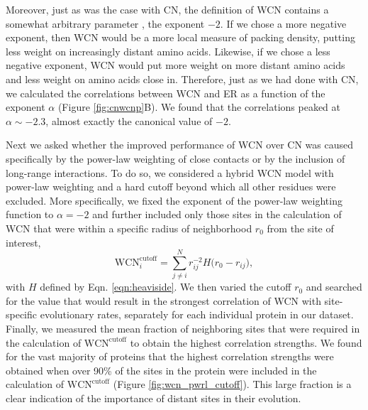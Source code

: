 \documentclass[12pt]{article}
\begin{document}
Moreover, just as was the case with CN, the definition of WCN contains a somewhat arbitrary parameter \cite{yang_protein_2009}, the exponent $-2$. If we chose a more negative exponent, then WCN would be a more local measure of packing density, putting less weight on increasingly distant amino acids. Likewise, if we chose a less negative exponent, WCN would put more weight on more distant amino acids and less weight on amino acids close in. Therefore, just as we had done with CN, we  calculated the correlations between WCN and ER as a function of the exponent $\alpha$ (Figure \ref{fig:cnwcnp}B). We found that the correlations peaked at $\alpha\sim -2.3$, almost exactly the canonical value of $-2$.

Next we asked whether the improved performance of WCN over CN was caused specifically by the power-law weighting of close contacts or by the inclusion of long-range interactions. To do so, we considered a hybrid WCN model with power-law weighting and a hard cutoff beyond which all other residues were excluded. More specifically, we fixed the exponent of the power-law weighting function to $\alpha=-2$ and further included only those sites in the calculation of WCN that were within a specific radius of neighborhood $r_0$ from the site of interest,
    \begin{equation}
        \label{eqn:wcn_pwrl_cutoff}
        \text{WCN}_{i}^\text{cutoff} = \sum^N_{j\neq i} r_{ij}^{-2} H\big(r_0-r_{ij}\big),
    \end{equation}
\noindent with $H$ defined by Eqn. \ref{eqn:heaviside}.
We then varied the cutoff $r_0$ and searched for the value that would result in the strongest correlation of WCN with site-specific evolutionary rates, separately for each individual protein in our dataset. Finally, we measured the mean fraction of neighboring sites that were required in the calculation of $\text{WCN}^\text{cutoff}$  to obtain the highest correlation strengths. We found for the vast majority of proteins that the highest correlation strengths were obtained when over 90\% of the sites in the protein were included in the calculation of $\text{WCN}^\text{cutoff}$ (Figure \ref{fig:wcn_pwrl_cutoff}). This large fraction is a clear indication of the importance of distant sites in their evolution.
\end{document}
